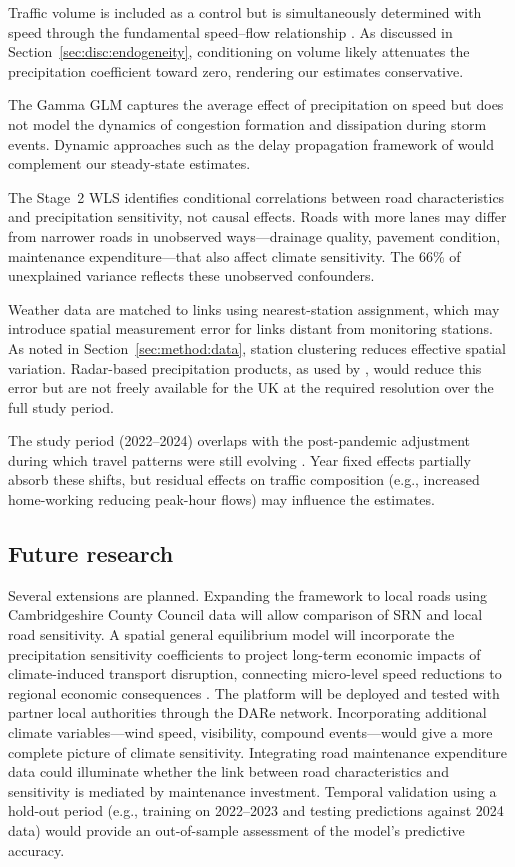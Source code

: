 \documentclass[review]{elsarticle}
\begin{document}
Traffic volume is included as a control but is simultaneously determined with speed through the fundamental speed--flow relationship \citep{greenshields1935study}. As discussed in Section~\ref{sec:disc:endogeneity}, conditioning on volume likely attenuates the precipitation coefficient toward zero, rendering our estimates conservative.

The Gamma GLM captures the average effect of precipitation on speed but does not model the dynamics of congestion formation and dissipation during storm events. Dynamic approaches such as the delay propagation framework of \citet{liu2026extreme} would complement our steady-state estimates.

The Stage~2 WLS identifies conditional correlations between road characteristics and precipitation sensitivity, not causal effects. Roads with more lanes may differ from narrower roads in unobserved ways---drainage quality, pavement condition, maintenance expenditure---that also affect climate sensitivity. The 66\% of unexplained variance reflects these unobserved confounders.

Weather data are matched to links using nearest-station assignment, which may introduce spatial measurement error for links distant from monitoring stations. As noted in Section~\ref{sec:method:data}, station clustering reduces effective spatial variation. Radar-based precipitation products, as used by \citet{becker2026rainfall}, would reduce this error but are not freely available for the UK at the required resolution over the full study period.

The study period (2022--2024) overlaps with the post-pandemic adjustment during which travel patterns were still evolving \citep{wan2024paradox}. Year fixed effects partially absorb these shifts, but residual effects on traffic composition (e.g., increased home-working reducing peak-hour flows) may influence the estimates.

\subsection{Future research}
\label{sec:disc:future}

Several extensions are planned. Expanding the framework to local roads using Cambridgeshire County Council data will allow comparison of SRN and local road sensitivity. A spatial general equilibrium model will incorporate the precipitation sensitivity coefficients to project long-term economic impacts of climate-induced transport disruption, connecting micro-level speed reductions to regional economic consequences \citep{ganin2017resilience}. The platform will be deployed and tested with partner local authorities through the DARe network. Incorporating additional climate variables---wind speed, visibility, compound events---would give a more complete picture of climate sensitivity. Integrating road maintenance expenditure data could illuminate whether the link between road characteristics and sensitivity is mediated by maintenance investment. Temporal validation using a hold-out period (e.g., training on 2022--2023 and testing predictions against 2024 data) would provide an out-of-sample assessment of the model's predictive accuracy.
\end{document}
